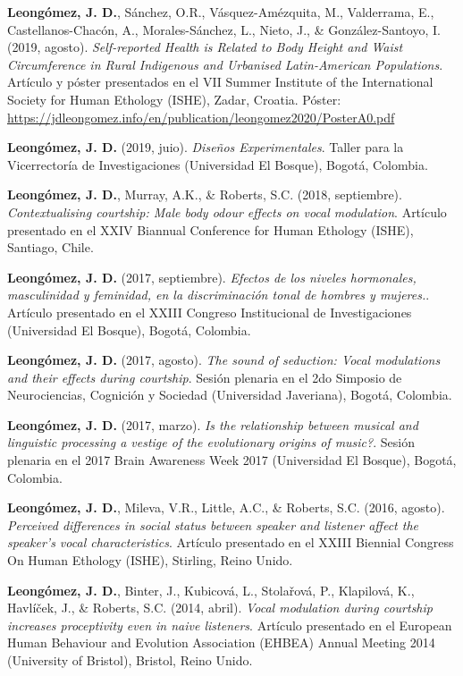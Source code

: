 \documentclass[11pt,a4paper,]{awesome-cv}
\begin{document}
\textbf{Leongómez, J. D.}, Sánchez, O.R., Vásquez-Amézquita, M.,
Valderrama, E., Castellanos-Chacón, A., Morales-Sánchez, L., Nieto, J.,
\& González-Santoyo, I. (2019, agosto). \emph{Self-reported Health is
Related to Body Height and Waist Circumference in Rural Indigenous and
Urbanised Latin-American Populations}. Artículo y póster presentados en
el VII Summer Institute of the International Society for Human Ethology
(ISHE), Zadar, Croatia. Póster:
\url{https://jdleongomez.info/en/publication/leongomez2020/PosterA0.pdf}

\textbf{Leongómez, J. D.} (2019, juio). \emph{Diseños Experimentales}.
Taller para la Vicerrectoría de Investigaciones (Universidad El Bosque),
Bogotá, Colombia.

\textbf{Leongómez, J. D.}, Murray, A.K., \& Roberts, S.C. (2018,
septiembre). \emph{Contextualising courtship: Male body odour effects on
vocal modulation}. Artículo presentado en el XXIV Biannual Conference
for Human Ethology (ISHE), Santiago, Chile.

\textbf{Leongómez, J. D.} (2017, septiembre). \emph{Efectos de los
niveles hormonales, masculinidad y feminidad, en la discriminación tonal
de hombres y mujeres.}. Artículo presentado en el XXIII Congreso
Institucional de Investigaciones (Universidad El Bosque), Bogotá,
Colombia.

\textbf{Leongómez, J. D.} (2017, agosto). \emph{The sound of seduction:
Vocal modulations and their effects during courtship}. Sesión plenaria
en el 2do Simposio de Neurociencias, Cognición y Sociedad (Universidad
Javeriana), Bogotá, Colombia.

\textbf{Leongómez, J. D.} (2017, marzo). \emph{Is the relationship
between musical and linguistic processing a vestige of the evolutionary
origins of music?}. Sesión plenaria en el 2017 Brain Awareness Week 2017
(Universidad El Bosque), Bogotá, Colombia.

\textbf{Leongómez, J. D.}, Mileva, V.R., Little, A.C., \& Roberts, S.C.
(2016, agosto). \emph{Perceived differences in social status between
speaker and listener affect the speaker's vocal characteristics}.
Artículo presentado en el XXIII Biennial Congress On Human Ethology
(ISHE), Stirling, Reino Unido.

\textbf{Leongómez, J. D.}, Binter, J., Kubicová, L., Stolařová, P.,
Klapilová, K., Havlíček, J., \& Roberts, S.C. (2014, abril). \emph{Vocal
modulation during courtship increases proceptivity even in naive
listeners}. Artículo presentado en el European Human Behaviour and
Evolution Association (EHBEA) Annual Meeting 2014 (University of
Bristol), Bristol, Reino Unido.
\end{document}
